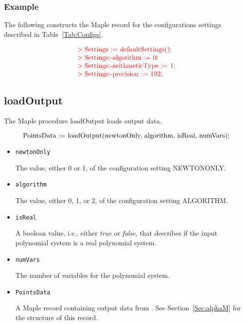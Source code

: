 \documentclass[11pt]{report}
\begin{document}
\subsubsection{Example}

The following constructs the Maple record for the
configurations settings described in Table~\ref{Tab:Configs}.

\[
\begin{color}{red}\begin{array}{l}
> \hbox{Settings := defaultSettings();} \\
> \hbox{Settings:-algorithm := 0;} \\
> \hbox{Settings:-arithmeticType := 1;} \\
> \hbox{Settings:-precision := 192;}
\end{array}\end{color}
\]

\subsection{loadOutput}\label{Sec:OutputM}

The Maple procedure loadOutput loads output data.

\[
\hbox{PointsData := loadOutput(newtonOnly, algorithm, isReal, numVars);}
\]

\begin{itemize}

\item {\tt newtonOnly}

The value, either 0 or 1, of the configuration setting NEWTONONLY.

\item {\tt algorithm}

The value, either 0, 1, or 2, of the configuration setting ALGORITHM.

\item {\tt isReal}

A boolean value, i.e., either {\em true} or {\em false}, that describes
if the input polynomial system is a real polynomial system.

\item {\tt numVars}

The number of variables for the polynomial system.

\item {\tt PointsData}

A Maple record containing output data from \blueharvest.
See Section~\ref{Sec:alphaM} for the structure of this record.

\end{itemize}
\end{document}
